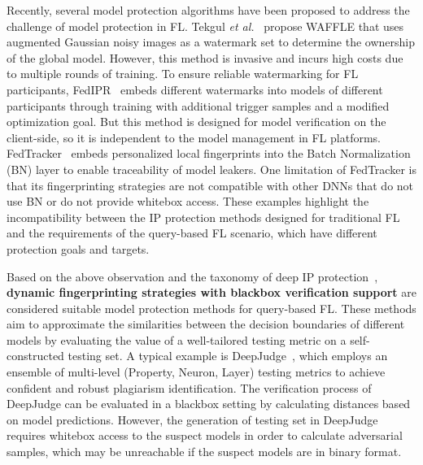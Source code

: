 Recently, several model protection algorithms have been proposed to address the challenge of model protection in FL. 
Tekgul \textit{et al.}~\cite{tekgul2021waffle} propose WAFFLE that uses augmented Gaussian noisy images as a watermark set to determine the ownership of the global model. 
However, this method is invasive and incurs high costs due to multiple rounds of training.
To ensure reliable watermarking for FL participants, FedIPR~\cite{li2023fedipr} embeds different watermarks into models of different participants through training with additional trigger samples and a modified optimization goal.
But this method is designed for model verification on the client-side, so it is independent to the model management in FL platforms.
FedTracker~\cite{shao2022fedtracker} embeds personalized local fingerprints into the Batch Normalization (BN) layer to enable traceability of model leakers.
One limitation of FedTracker is that its fingerprinting strategies are not compatible with other DNNs that do not use BN or do not provide whitebox access.
These examples highlight the incompatibility between the IP protection methods designed for traditional FL and the requirements of the query-based FL scenario, which have different protection goals and targets.

Based on the above observation and the taxonomy of deep IP protection~\cite{peng2022intellectual, sun2023deep}, \textbf{dynamic fingerprinting strategies with blackbox verification support} are considered suitable model protection methods for query-based FL.
These methods aim to approximate the similarities between the decision boundaries of different models by evaluating the value of a well-tailored testing metric on a self-constructed testing set.
A typical example is DeepJudge~\cite{chen2022copy}, which employs an ensemble of multi-level (Property, Neuron, Layer) testing metrics to achieve confident and robust plagiarism identification. 
The verification process of DeepJudge can be evaluated in a blackbox setting by calculating distances based on model predictions.
However, the generation of testing set in DeepJudge requires whitebox access to the suspect models in order to calculate adversarial samples, which may be unreachable if the suspect models are in binary format.

